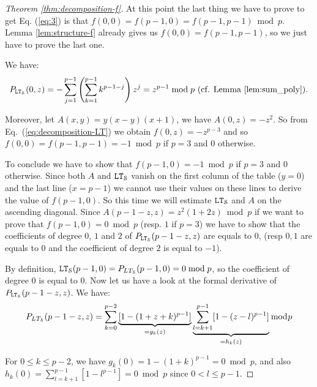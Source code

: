\begin{proof}[Theorem \ref{thm:decomposition-f}]
    At this point the last thing we have to prove to get Eq. (\ref{eq:3}) is that $f(0,0) = f(p-1,0) = f(p-1,p-1) \bmod p$. Lemma \ref{lem:structure-f} already gives us $f(0,0) = f(p-1,p-1)$, so we just have to prove the last one.

    We have:
    $$ P_{\LT_\S}(0,z)  = -\sum_{j=1}^{p-1}\left(\sum_{k=1}^{p-1}k^{p-1-j}\right)z^j  = z^{p-1} \bmod p \text{ (cf. Lemma \ref{lem:sum_poly}).} $$

    Moreover, let $A(x,y) = y(x-y)(x+1)$, we have $A(0,z) = -z^2$. So from Eq.~(\ref{eq:decomposition-LT}) we obtain $f(0,z) = -z^{p-3}$ and so $f(0,0) = f(p-1,p-1) = -1 \bmod p$ if $p = 3$ and $0$ otherwise.

    To conclude we have to show that $f(p-1,0) = -1 \bmod p$ if $p=3$ and $0$ otherwise. 
    Since both $A$ and $\LT_\S$ vanish on the first column of the table ($y=0$) and the last line ($x=p-1$) we cannot use their values on these lines to derive the value of $f(p-1,0)$. So this time we will estimate $\LT_\S$ and $A$ on the ascending diagonal. Since $A(p-1-z,z) = z^2(1+2z) \bmod p$ if we want to prove that $f(p-1,0) = 0 \bmod p$ (resp. $1$ if $p=3$) we have to show that the coefficients of degree $0$, $1$ and $2$ of $P_{\LT_\S}(p-1-z,z)$ are equals to $0$, (resp $0, 1$ are equals to $0$ and the coefficient of degree $2$ is equal to $-1$).

    By definition, $\LT_\S(p-1,0) = P_{LT_\S}(p-1,0) = 0 \bmod p$, so the coefficient of degree $0$ is equal to $0$. Now let us have a look at the formal derivative of $P_{\LT_\S}(p-1-z,z)$. We have: 
    $$ P_{LT_\S}(p-1-z,z) = \sum_{k=0}^{p-2}\underbrace{[1-(1+z+k)^{p-1}]}_{=g_k(z)}\underbrace{\sum_{l=k+1}^{p-1}[1-(z-l)^{p-1}]}_{=h_k(z)} \bmod p $$
 
  For $0\leq k \leq p-2$, we have $g_k(0) = 1-(1+k)^{p-1} = 0 \bmod p$, and also $h_k(0) = \sum_{l=k+1}^{p-1}[1-l^{p-1}] = 0 \bmod p$ since $0<l\leq p-1$. 


\end{proof}
